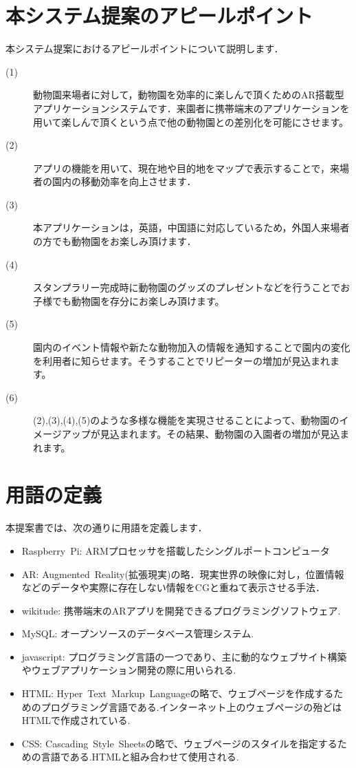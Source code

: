 \documentclass[a4j]{jarticle}
\begin{document}
\section{本システム提案のアピールポイント}
本システム提案におけるアピールポイントについて説明します．
\begin{description}
\item[(1)] 動物園来場者に対して，動物園を効率的に楽しんで頂くためのAR搭載型アプリケーションシステムです．来園者に携帯端末のアプリケーションを用いて楽しんで頂くという点で他の動物園との差別化を可能にさせます。
\item[(2)] アプリの機能を用いて、現在地や目的地をマップで表示することで，来場者の園内の移動効率を向上させます．
\item[(3)] 本アプリケーションは，英語，中国語に対応しているため，外国人来場者の方でも動物園をお楽しみ頂けます．
\item[(4)] スタンプラリー完成時に動物園のグッズのプレゼントなどを行うことでお子様でも動物園を存分にお楽しみ頂けます。
\item[(5)] 園内のイベント情報や新たな動物加入の情報を通知することで園内の変化を利用者に知らせます。そうすることでリピーターの増加が見込まれます。
\item[(6)] (2),(3),(4),(5)のような多様な機能を実現させることによって、動物園のイメージアップが見込まれます。その結果、動物園の入園者の増加が見込まれます。
\end{description}

\section{用語の定義}
  本提案書では、次の通りに用語を定義します．
\begin{itemize}
\item Raspberry~Pi: ARMプロセッサを搭載したシングルポートコンピュータ
\item AR: Augmented~Reality(拡張現実)の略．現実世界の映像に対し，位置情報などのデータや実際に存在しない情報をCGと重ねて表示させる手法．
\item wikitude: 携帯端末のARアプリを開発できるプログラミングソフトウェア.
\item MySQL: オープンソースのデータベース管理システム.
\item javascript: プログラミング言語の一つであり、主に動的なウェブサイト構築やウェブアプリケーション開発の際に用いられる.
\item HTML: Hyper~Text~Markup~Languageの略で、ウェブページを作成するためのプログラミング言語である.インターネット上のウェブページの殆どはHTMLで作成されている.
\item CSS: Cascading~Style~Sheetsの略で、ウェブページのスタイルを指定するための言語である.HTMLと組み合わせて使用される.
\end{itemize}
\end{document}
